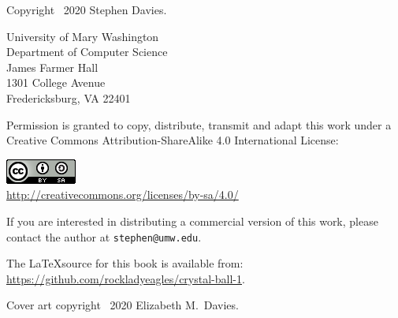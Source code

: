 
\thispagestyle{empty}

Copyright \textcopyright \ 2020 Stephen Davies.

\bigskip

University of Mary Washington\\
Department of Computer Science\\
James Farmer Hall\\
1301 College Avenue\\
Fredericksburg, VA  22401

\vspace{.4in}

Permission is granted to copy, distribute, transmit and adapt this work under a
Creative Commons Attribution-ShareAlike 4.0 International License:

\vspace{-.2in}
\begin{center}
\includegraphics{cc_license.png}\\
\smallskip
\url{http://creativecommons.org/licenses/by-sa/4.0/}
\end{center}

\vspace{.1in}
If you are interested in distributing a commercial version of this work, please
contact the author at \texttt{stephen@umw.edu}.

\vspace{1.6in}
The \LaTeX source for this book is available from:
\url{https://github.com/rockladyeagles/crystal-ball-1}.

\vspace{.4in}
Cover art copyright \textcopyright \ 2020 Elizabeth M.~Davies.

